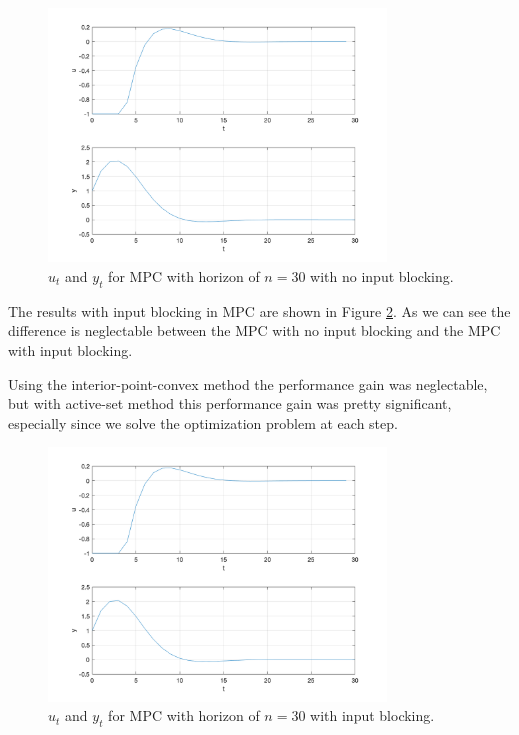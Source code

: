 \documentclass[11pt, a4paper, english]{NTNUoving}
\begin{document}
\begin{oppgave}
\begin{punkt}
        \begin{figure}[H]
            \centering
            \includegraphics[width=0.8\textwidth]{../3d.png}
            \caption{$u_t$ and $y_t$ for MPC with horizon of $n=30$ with no input blocking.}
            \label{fig:3d}
        \end{figure}
    \end{punkt}

    \begin{punkt}
        The results with input blocking in MPC are shown in Figure \ref{fig:3e}.
        As we can see the difference is neglectable between the MPC with no input blocking and
        the MPC with input blocking.

        Using the interior-point-convex method the performance gain was neglectable, but
        with active-set method this performance gain was pretty significant, especially
        since we solve the optimization problem at each step.

        \begin{figure}[H]
            \centering
            \includegraphics[width=0.8\textwidth]{../3d.png}
            \caption{$u_t$ and $y_t$ for MPC with horizon of $n=30$ with input blocking.}
            \label{fig:3e}
        \end{figure}
    \end{punkt}


\end{oppgave}
\end{document}

